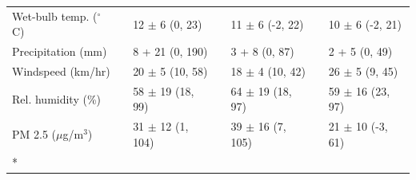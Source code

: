 \begin{longtable}[t]{lllllll}
\hspace{1em}Wet-bulb temp. ($^\circ$C) &  & 12 $\pm$ 6 (0, 23) &  & 11 $\pm$ 6 (-2, 22) &  & 10 $\pm$ 6 (-2, 21)\\
\hspace{1em}Precipitation (mm) &  & 8 + 21 (0, 190) &  & 3 + 8 (0, 87) &  & 2 + 5 (0, 49)\\
\hspace{1em}Windspeed (km/hr) &  & 20 $\pm$ 5 (10, 58) &  & 18 $\pm$ 4 (10, 42) &  & 26 $\pm$ 5 (9, 45)\\
\hspace{1em}Rel. humidity (\%) &  & 58 $\pm$ 19 (18, 99) &  & 64 $\pm$ 19 (18, 97) &  & 59 $\pm$ 16 (23, 97)\\
\hspace{1em}PM 2.5 ($\mu$g/m$^{3}$) &  & 31 $\pm$ 12 (1, 104) &  & 39 $\pm$ 16 (7, 105) &  & 21 $\pm$ 10 (-3, 61)\\*
\end{longtable}
\endgroup{}
